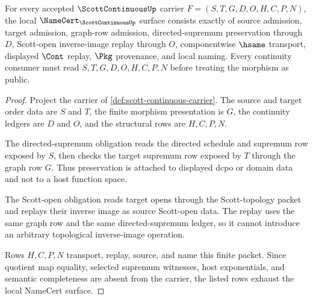 \begin{theorem}
\label{thm:scott-continuous-namecert-obligations}
For every accepted $\ScottContinuousUp$ carrier $F=(S,T,G,D,O,H,C,P,N)$, the local $\NameCert_{\ScottContinuousUp}$ surface consists exactly of source admission, target admission, graph-row admission, directed-supremum preservation through $D$, Scott-open inverse-image replay through $O$, componentwise $\hsame$ transport, displayed $\Cont$ replay, $\Pkg$ provenance, and local naming. Every continuity consumer must read $S,T,G,D,O,H,C,P,N$ before treating the morphism as public.
\end{theorem}
\begin{proof}
Project the carrier of \autoref{def:scott-continuous-carrier}. The source and target order data are $S$ and $T$, the finite morphism presentation is $G$, the continuity ledgers are $D$ and $O$, and the structural rows are $H,C,P,N$.

The directed-supremum obligation reads the directed schedule and supremum row exposed by $S$, then checks the target supremum row exposed by $T$ through the graph row $G$. Thus preservation is attached to displayed dcpo or domain data and not to a host function space.

The Scott-open obligation reads target opens through the Scott-topology packet and replays their inverse image as source Scott-open data. The replay uses the same graph row and the same directed-supremum ledger, so it cannot introduce an arbitrary topological inverse-image operation.

Rows $H,C,P,N$ transport, replay, source, and name this finite packet. Since quotient map equality, selected supremum witnesses, host exponentials, and semantic completeness are absent from the carrier, the listed rows exhaust the local NameCert surface.
\end{proof}

